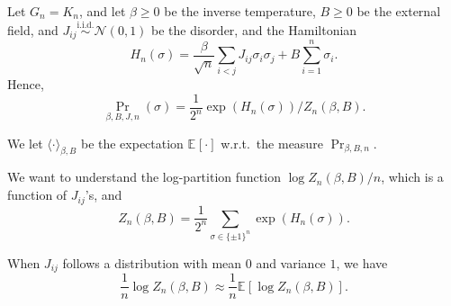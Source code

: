 Let \(G_n = K_n\), and let \(\beta \geq 0\) be the inverse temperature, \(B \geq 0\) be the external field, and \(J_{ij} \overset{\text{i.i.d.} }{\sim } \mathcal{N} (0, 1)\) be the disorder, and the Hamiltonian
\[
	H_n(\sigma )
	= \frac{\beta }{\sqrt{n} }\sum_{i < j} J_{ij} \sigma _i \sigma _j + B \sum_{i=1}^{n} \sigma _i.
\]
Hence,
\[
	\Pr_{\beta , B, J, n}\left(\sigma \right)
	= \frac{1}{2^n} \exp (H_n(\sigma )) / Z_n(\beta , B).
\]

\begin{notation}
	We let \(\langle \cdot \rangle _{\beta , B}\) be the expectation \(\mathbb{E}_{}[\cdot] \) w.r.t.\ the measure \(\Pr_{\beta , B, n} \).
\end{notation}

We want to understand the log-partition function \(\log Z_n(\beta , B) / n\), which is a function of \(J_{ij}\)'s, and
\[
	Z_n(\beta , B)
	= \frac{1}{2^n} \sum_{\sigma \in \{ \pm 1 \} ^n} \exp (H_n(\sigma )).
\]

\begin{lemma}
	When \(J_{ij}\) follows a distribution with mean \(0\) and variance \(1\), we have
	\[
		\frac{1}{n} \log Z_n(\beta , B)
		\approx \frac{1}{n} \mathbb{E}_{}[\log Z_n(\beta , B)] .
	\]
\end{lemma}

